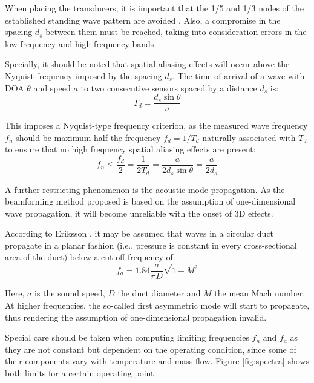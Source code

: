 When placing the transducers, it is important that the 1/5 and 1/3 nodes of the established standing wave pattern are avoided \cite{dowling1983sound}. Also, a compromise in the spacing $d_s$ between them must be reached, taking into consideration errors in the  low-frequency \cite{aabom1988error} and high-frequency \cite{seybert1988two} bands.

Specially, it should be noted that spatial aliasing effects will occur above the Nyquist frequency imposed by the spacing $d_s$. The time of arrival of a wave with DOA $\theta$ and speed $a$ to two consecutive sensors spaced by a distance $d_s$ is:
\begin{equation}
  T_d = \frac{d_s \sin \theta}{a}
\end{equation}

This imposes a Nyquist-type frequency criterion, as the measured wave frequency $f_n$ should be maximum half the frequency $f_d=1/T_d$ naturally associated with $T_d$ to ensure that no high frequency spatial aliasing effects are present:
\begin{equation}\label{eq:f_nyquist}
  f_n \leq \frac{f_d}{2} = \frac{1}{2T_d}=\frac{a}{2d_s \sin \theta}=\frac{a}{2d_s}
\end{equation}

A further restricting phenomenon is the acoustic mode propagation. As the beamforming method proposed is based on the assumption of one-dimensional wave propagation, it will become unreliable with the onset of 3D effects.

According to Eriksson \cite{eriksson1980higher}, it may be assumed that waves in a circular duct propagate in a planar fashion (i.e., pressure is constant in every cross-sectional area of the duct) below a cut-off frequency of:
\begin{equation}\label{eq:f_modes}
f_a = 1.84 \frac{a}{\pi D}\sqrt{1-M^2}
\end{equation}

Here, $a$ is the sound speed, $D$ the duct diameter and $M$ the mean Mach number. At higher frequencies, the so-called first asymmetric mode will start to propagate, thus rendering the assumption of one-dimensional propagation invalid.

Special care should be taken when computing limiting frequencies $f_n$ and $f_a$ as they are not constant but dependent on the operating condition, since some of their components vary with temperature and mass flow. Figure \ref{fig:spectra} shows both limits for a certain operating point.

